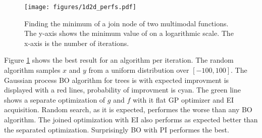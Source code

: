 \documentclass[english]{article}
\begin{document}
\begin{figure}
  \texttt{[image: figures/1d2d\_perfs.pdf]}
  \caption{Finding the minimum of a join node of two multimodal functions. The y-axis shows the minimum value of on a logarithmic scale. The x-axis is the number of iterations.}
  \label{1d2d_perfs}
\end{figure}

Figure \ref{1d2d_perfs} shows the best result for an algorithm per iteration. The random algorithm samples $x$ and $y$ from a uniform distribution over $[-100, 100]$. The Gaussian process BO algorithm for trees is with expected improvment is displayed with a red lines, probability of improvment is cyan. The green line shows a separate optimization of $g$ and $f$ with it flat GP optimizer and EI acquisition.
Random search, as it is expected, performes the worse than any BO algorithm. The joined optimization with EI also performs as expected better than the separated optimization. Surprisingly BO with PI performes the best.



\end{document}
